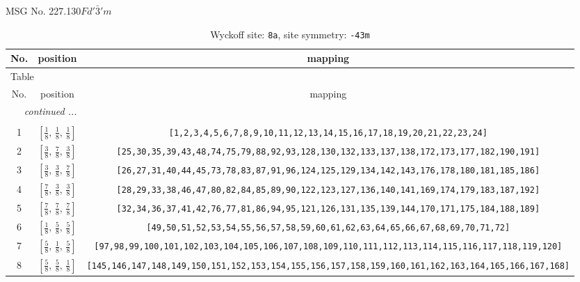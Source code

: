 \documentclass[fleqn,8pt]{jsarticle}
\begin{document}
\setcounter{MaxMatrixCols}{32}

\renewcommand{\tablename}{Table~}
\renewcommand{\figurename}{Figure~}
\begin{center}
\LARGE
MSG No. 227.130\quad$Fd'\bar{3}'m$
\end{center}
\renewcommand{\arraystretch}{1.2}
\begin{longtable}{ccc}
\caption{Wyckoff site: {\tt 8a}, site symmetry: {\tt -43m}}
 \\
 \hline \hline
No. & position & mapping \\ \hline \endfirsthead

\multicolumn{2}{l}{\tablename\ \thetable{}} \\
 \hline \hline
No. & position & mapping \\ \hline \endhead

 \hline \hline
\multicolumn{2}{r}{\footnotesize\it continued ...} \\ \endfoot

 \hline \hline
\multicolumn{2}{r}{} \\ \endlastfoot

1 & $\left[ \frac{1}{8},\, \frac{1}{8},\, \frac{1}{8} \right]$ & {\tt [1,2,3,4,5,6,7,8,9,10,11,12,13,14,15,16,17,18,19,20,21,22,23,24]} \\ \hline
2 & $\left[ \frac{3}{8},\, \frac{7}{8},\, \frac{3}{8} \right]$ & {\tt [25,30,35,39,43,48,74,75,79,88,92,93,128,130,132,133,137,138,172,173,177,182,190,191]} \\ \hline
3 & $\left[ \frac{3}{8},\, \frac{3}{8},\, \frac{7}{8} \right]$ & {\tt [26,27,31,40,44,45,73,78,83,87,91,96,124,125,129,134,142,143,176,178,180,181,185,186]} \\ \hline
4 & $\left[ \frac{7}{8},\, \frac{3}{8},\, \frac{3}{8} \right]$ & {\tt [28,29,33,38,46,47,80,82,84,85,89,90,122,123,127,136,140,141,169,174,179,183,187,192]} \\ \hline
5 & $\left[ \frac{7}{8},\, \frac{7}{8},\, \frac{7}{8} \right]$ & {\tt [32,34,36,37,41,42,76,77,81,86,94,95,121,126,131,135,139,144,170,171,175,184,188,189]} \\ \hline
6 & $\left[ \frac{1}{8},\, \frac{5}{8},\, \frac{5}{8} \right]$ & {\tt [49,50,51,52,53,54,55,56,57,58,59,60,61,62,63,64,65,66,67,68,69,70,71,72]} \\ \hline
7 & $\left[ \frac{5}{8},\, \frac{1}{8},\, \frac{5}{8} \right]$ & {\tt [97,98,99,100,101,102,103,104,105,106,107,108,109,110,111,112,113,114,115,116,117,118,119,120]} \\ \hline
8 & $\left[ \frac{5}{8},\, \frac{5}{8},\, \frac{1}{8} \right]$ & {\tt [145,146,147,148,149,150,151,152,153,154,155,156,157,158,159,160,161,162,163,164,165,166,167,168]} \\
\end{longtable}
\end{document}
